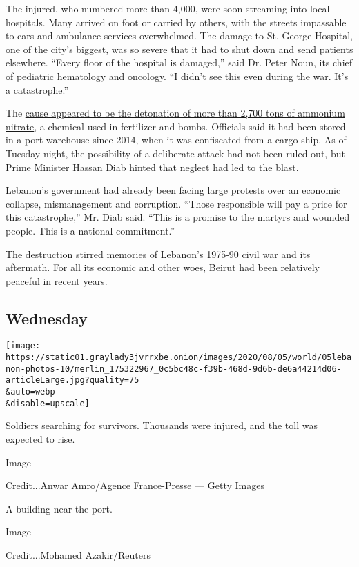 The injured, who numbered more than 4,000, were soon streaming into
local hospitals. Many arrived on foot or carried by others, with the
streets impassable to cars and ambulance services overwhelmed. The
damage to St. George Hospital, one of the city's biggest, was so severe
that it had to shut down and send patients elsewhere. ``Every floor of
the hospital is damaged,'' said Dr. Peter Noun, its chief of pediatric
hematology and oncology. ``I didn't see this even during the war. It's a
catastrophe.''

The
\href{https://www.nytimes3xbfgragh.onion/2020/08/05/world/middleeast/beirut-explosion-what-happened.html}{cause
appeared to be the detonation of more than 2,700 tons of ammonium
nitrate}, a chemical used in fertilizer and bombs. Officials said it had
been stored in a port warehouse since 2014, when it was confiscated from
a cargo ship. As of Tuesday night, the possibility of a deliberate
attack had not been ruled out, but Prime Minister Hassan Diab hinted
that neglect had led to the blast.

Lebanon's government had already been facing large protests over an
economic collapse, mismanagement and corruption. ``Those responsible
will pay a price for this catastrophe,'' Mr. Diab said. ``This is a
promise to the martyrs and wounded people. This is a national
commitment.''

The destruction stirred memories of Lebanon's 1975-90 civil war and its
aftermath. For all its economic and other woes, Beirut had been
relatively peaceful in recent years.

\hypertarget{wednesday}{%
\subsection{Wednesday}\label{wednesday}}

\texttt{[image: https://static01.graylady3jvrrxbe.onion/images/2020/08/05/world/05lebanon-photos-10/merlin\_175322967\_0c5bc48c-f39b-468d-9d6b-de6a44214d06-articleLarge.jpg?quality=75\\\&auto=webp\\\&disable=upscale]}

Soldiers searching for survivors. Thousands were injured, and the toll
was expected to rise.

Image

Credit...Anwar Amro/Agence France-Presse --- Getty Images

A building near the port.

Image

Credit...Mohamed Azakir/Reuters

